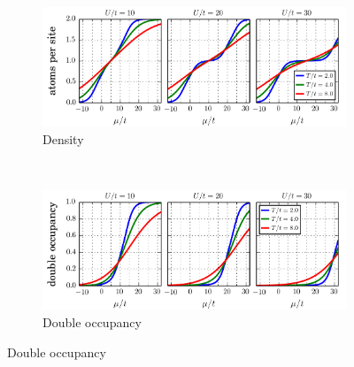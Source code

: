 \documentclass[11pt,letter]{article}
\begin{document}
\begin{figure}
        \centering
        \begin{subfigure}[b]{0.49\textwidth}
                \includegraphics[width=\textwidth]{figures/HTSE_density_U.png}
                \caption{Density}
\label{fig:HTSEhomogeneousA}
        \end{subfigure}%
        ~
        \begin{subfigure}[b]{0.49\textwidth}
                \includegraphics[width=\textwidth]{figures/HTSE_doublons_U.png}
                \caption{Double occupancy}
\label{fig:HTSEhomogeneousB}
        \end{subfigure}
 

\end{figure}
\end{document}
